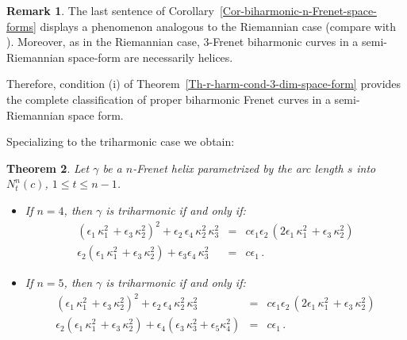 \documentclass[11pt]{amsart}
\theoremstyle{plain}
\newtheorem{theorem}                {Theorem}      [section]
\theoremstyle{definition}
\newtheorem{remark}       [theorem]  {Remark}
\numberwithin{equation}{section}
\begin{document}
\begin{remark} The last sentence of Corollary~\ref{Cor-biharmonic-n-Frenet-space-forms} displays a phenomenon analogous to the Riemannian case (compare with \cite[Theorem~1.9]{MR2}). Moreover, as in the Riemannian case, $3$-Frenet biharmonic curves in a semi-Riemannian space-form are necessarily helices. 

Therefore, condition (i) of Theorem~\ref{Th-r-harm-cond-3-dim-space-form} provides the complete classification of proper biharmonic Frenet curves in a semi-Riemannian space form.
\end{remark}
Specializing to the triharmonic case we obtain:
\begin{theorem}\label{cor-n-Frenet-tri-spaceforms}
Let $\gamma$ be a $n$-Frenet helix parametrized by the arc length $s$ into $N_t^n(c)$, $1 \leq t \leq n-1$.
\begin{itemize} 
\item[(i)] If $n=4$, then $\gamma$ is triharmonic if and only if:
\begin{eqnarray*}
 (\epsilon_1\, \kappa_1^2 \,  + \epsilon_3 \, \kappa_2^2)^2  + \epsilon_2 \, \epsilon_4  \, \kappa_2^2 \, \kappa_3^2 & = &c \epsilon_1 \epsilon_2 \, (2 \epsilon_1\, \kappa_1^2 \,  + \epsilon_3 \, \kappa_2^2 ) \\
 \epsilon_2 (\epsilon_1\, \kappa_1^2 \,  + \epsilon_3 \, \kappa_2^2 )+ \epsilon_3 \epsilon_4 \,  \kappa_3^2   & = & c \epsilon_1 \,.
\end{eqnarray*}
\item[(ii)] If $n=5$, then $\gamma$ is triharmonic if and only if:
\begin{eqnarray*}
 (\epsilon_1\, \kappa_1^2 \,  + \epsilon_3 \, \kappa_2^2)^2  + \epsilon_2 \, \epsilon_4  \, \kappa_2^2 \, \kappa_3^2 & = &c \epsilon_1 \epsilon_2 \, (2 \epsilon_1\, \kappa_1^2 \,  + \epsilon_3 \, \kappa_2^2 ) \\
 \epsilon_2 (\epsilon_1\, \kappa_1^2 \,  + \epsilon_3 \, \kappa_2^2 )+ \epsilon_4(\epsilon_3 \,   \kappa_3^2 + \epsilon_5 \kappa_4^2)  & = & c \epsilon_1 \,.
\end{eqnarray*}
\end{itemize}
\end{theorem}
\end{document}

